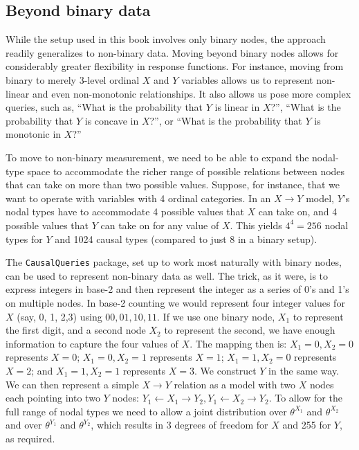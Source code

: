 \documentclass[
  12pt,
]{book}
\begin{document}
\hypertarget{beyond-binary-data}{%
\subsection{Beyond binary data}\label{beyond-binary-data}}

While the setup used in this book involves only binary nodes, the approach readily generalizes to non-binary data. Moving beyond binary nodes allows for considerably greater flexibility in response functions. For instance, moving from binary to merely 3-level ordinal \(X\) and \(Y\) variables allows us to represent non-linear and even non-monotonic relationships. It also allows us pose more complex queries, such as, ``What is the probability that \(Y\) is linear in \(X\)?'', ``What is the probability that \(Y\) is concave in \(X\)?'', or ``What is the probability that \(Y\) is monotonic in \(X\)?''

To move to non-binary measurement, we need to be able to expand the nodal-type space to accommodate the richer range of possible relations between nodes that can take on more than two possible values. Suppose, for instance, that we want to operate with variables with 4 ordinal categories. In an \(X \rightarrow Y\) model, \(Y\)'s nodal types have to accommodate 4 possible values that \(X\) can take on, and 4 possible values that \(Y\) can take on for any value of \(X\). This yields \(4^4 = 256\) nodal types for \(Y\) and 1024 causal types (compared to just 8 in a binary setup).

The \texttt{CausalQueries} package, set up to work most naturally with binary nodes, can be used to represent non-binary data as well. The trick, as it were, is to express integers in base-2 and then represent the integer as a series of 0's and 1's on multiple nodes. In base-2 counting we would represent four integer values for \(X\) (say, 0, 1, 2,3) using \(00, 01, 10, 11\). If we use one binary node, \(X_1\) to represent the first digit, and a second node \(X_2\) to represent the second, we have enough information to capture the four values of \(X\). The mapping then is: \(X_1 = 0, X_2 = 0\) represents \(X=0\); \(X_1 = 0, X_2 = 1\) represents \(X=1\); \(X_1 = 1, X_2 = 0\) represents \(X=2\); and \(X_1 = 1, X_2 = 1\) represents \(X=3\). We construct \(Y\) in the same way. We can then represent a simple \(X \rightarrow Y\) relation as a model with two \(X\) nodes each pointing into two \(Y\) nodes: \(Y_1 \leftarrow X_1 \rightarrow Y_2, Y_1 \leftarrow X_2 \rightarrow Y_2\). To allow for the full range of nodal types we need to allow a joint distribution over \(\theta^{X_1}\) and \(\theta^{X_2}\) and over \(\theta^{Y_1}\) and \(\theta^{Y_2}\), which results in 3 degrees of freedom for \(X\) and 255 for \(Y\), as required.
\end{document}

